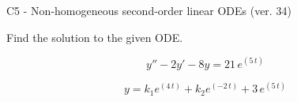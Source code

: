 \begin{exercise}
  \begin{exerciseTitle}C5 - Non-homogeneous second-order linear ODEs (ver. 34)\end{exerciseTitle}
  \begin{exerciseStatement}
    
Find the solution to the given ODE.

    
\[y''-2y'-8y = 21 \, e^{\left(5 \, t\right)}\]

  \end{exerciseStatement}
  \begin{exerciseAnswer}
    
\[y= k_{1} e^{\left(4 \, t\right)} + k_{2} e^{\left(-2 \, t\right)} + 3 \, e^{\left(5 \, t\right)}\]

  \end{exerciseAnswer}
\end{exercise}